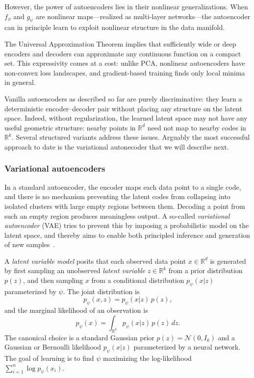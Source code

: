 However, the power of autoencoders lies in their nonlinear generalizations. When $f_\phi$ and 
$g_\psi$ are nonlinear maps---realized as multi-layer networks---the autoencoder can 
in principle learn to exploit nonlinear structure in the data manifold.

The Universal Approximation Theorem  implies that 
sufficiently wide or deep encoders and decoders can approximate any continuous 
function on a compact set. This expressivity comes at a cost: unlike PCA, nonlinear 
autoencoders have non-convex loss landscapes, and gradient-based training finds only  local minima in general.

Vanilla autoencoders as described so far are purely discriminative: they learn a 
deterministic encoder--decoder pair without placing any structure on the latent 
space. Indeed, without regularization, the learned latent space may not have any useful  geometric structure: nearby points in $\mathbb{R}^d$ need not map to nearby codes in $\mathbb{R}^k$. Several structured variants address these issues. Arguably the most successful approach to date is the variational autonecoder that we will describe next.





\subsubsection{Variational autoencoders}

In a standard autoencoder, the encoder maps each data point 
to a single code, and there is no mechanism preventing the latent codes from  collapsing into isolated clusters with large empty regions between them. Decoding 
a point from such an empty region produces meaningless output. A so-called {\em variational autoencoder} (VAE) tries to prevent this by imposing a probabilistic model on 
the latent space, and thereby aims to enable both principled inference and generation of new samples~\cite{kingma2013auto,diederik2019introduction}.

A \emph{latent variable model} posits that each observed data point $x \in 
\mathbb{R}^d$ is generated by first sampling an unobserved \emph{latent variable} 
$z \in \mathbb{R}^k$ from a prior distribution $p(z)$, and then sampling $x$ 
from a conditional distribution $p_\psi(x | z)$ parameterized by $\psi$. 
The joint distribution is
$$
p_\psi(x, z) = p_\psi(x | z) \, p(z),
$$
and the marginal likelihood of an observation is
\begin{equation}
    p_\psi(x) = \int_{\mathbb{R}^k} p_\psi(x | z) \, p(z) \, dz.
    \label{eq:marginal_likelihood}
\end{equation}
The canonical choice is a standard Gaussian prior $p(z) = \mathcal{N}(0, I_k)$
and a Gaussian or Bernoulli likelihood $p_\psi(x | z)$ parameterized by a
neural network. The goal of learning is to find $\psi$ maximizing the
log-likelihood $\sum_{i=1}^n \log p_\psi(x_i)$.

